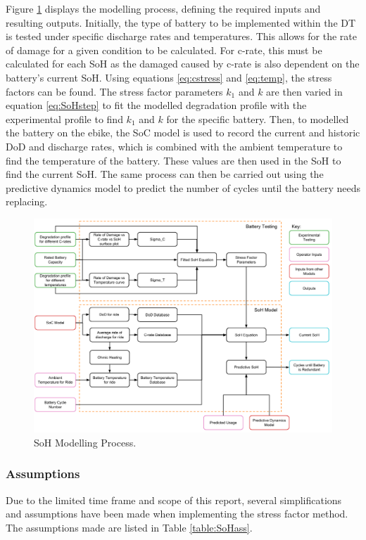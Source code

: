 \documentclass[a4paper, 10pt]{article}
\numberwithin{equation}{section}
\begin{document}
Figure \ref{fig:SoHprocess} displays the modelling process, defining the required inputs and resulting outputs. Initially, the type of battery to be implemented within the DT is tested under specific discharge rates and temperatures. This allows for the rate of damage for a given condition to be calculated. For c-rate, this must be calculated for each SoH as the damaged caused by c-rate is also dependent on the battery's current SoH. Using equations \ref{eq:cstress} and \ref{eq:temp}, the stress factors can be found. The stress factor parameters $k_1$ and $k$ are then varied in equation \ref{eq:SoHstep} to fit the modelled degradation profile with the experimental profile to find $k_1$ and $k$ for the specific battery. Then, to modelled the battery on the ebike, the SoC model is used to record the current and historic DoD and discharge rates, which is combined with the ambient temperature to find the temperature of the battery. These values are then used in the SoH to find the current SoH. The same process can then be carried out using the predictive dynamics model to predict the number of cycles until the battery needs replacing.

\begin{figure}[H]
    \centering
    \includegraphics[width=1\linewidth]{images/SoH_model_diagram.png}
    \caption{SoH Modelling Process.}
    \label{fig:SoHprocess}
\end{figure}

\subsubsection{Assumptions}
Due to the limited time frame and scope of this report, several simplifications and assumptions have been made when implementing the stress factor method. The assumptions made are listed in Table \ref{table:SoHass}.
\end{document}
